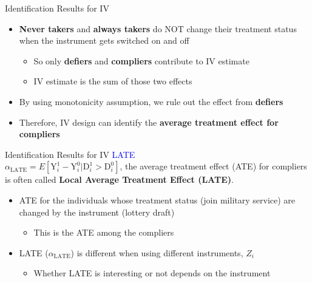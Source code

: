 \documentclass[dvipsnames,hyperref={pdfpagelabels=false}]{beamer}
\begin{document}
\begin{frame}{Identification Results for IV}
	
	\begin{itemize}
		\vspace{0.2cm}
		\item \textbf{Never takers} and \textbf{always takers} do NOT change their treatment status when the instrument gets switched on and off
		\vspace{0.2cm}
		\begin{itemize}
			\item So only \textbf{defiers} and \textbf{compliers} contribute to IV estimate 
			\vspace{0.2cm}
			\item IV estimate is the sum of those two effects
			\vspace{0.2cm}
		\end{itemize}
		\item By using monotonicity assumption, we rule out the effect from \textbf{defiers}
		\vspace{0.2cm}
		\item Therefore, IV design can identify the \textbf{average treatment effect for compliers}
	\end{itemize}
\end{frame}








\begin{frame}{Identification Results for IV}
	\textcolor{blue}{LATE}\\
	$\alpha_{\text{LATE}}=E[\mathrm{Y}^{1}_{i}-\mathrm{Y}^{0}_{i}|\mathrm{D}^{1}_{i}>\mathrm{D}^{0}_{i}]$, the average treatment effect (ATE) for compliers is often called \textbf{Local Average Treatment Effect (LATE)}.
	\begin{itemize}
		\vspace{0.2cm}
		\item ATE for the individuals whose treatment status (join military service) are changed by the instrument (lottery draft)
		\vspace{0.2cm}
			\begin{itemize}
		\item This is the ATE among the compliers
		\vspace{0.2cm}
			\end{itemize}
		\item LATE ($\alpha_{\text{LATE}}$) is different when using different instruments, $Z_{i}$
		\vspace{0.2cm}
					\begin{itemize}
		\item Whether LATE is interesting or not depends on the instrument
					\end{itemize}
	\end{itemize}
\end{frame}
\end{document}
